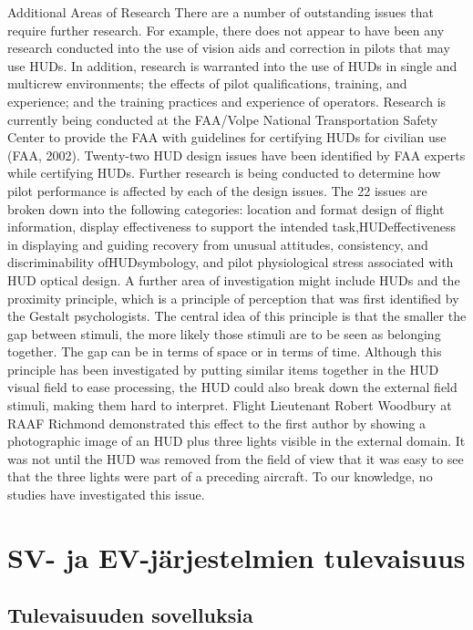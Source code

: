 \documentclass[utf8,bachelor,manualbib]{gradu3}
\begin{document}
Additional Areas of Research
There are a number of outstanding issues that require further research. For example,
there does not appear to have been any research conducted into the use of
vision aids and correction in pilots that may use HUDs. In addition, research is
warranted into the use of HUDs in single and multicrew environments; the effects
of pilot qualifications, training, and experience; and the training practices
and experience of operators.
Research is currently being conducted at the FAA/Volpe National Transportation
Safety Center to provide the FAA with guidelines for certifying HUDs for civilian
use (FAA, 2002). Twenty-two HUD design issues have been identified by
FAA experts while certifying HUDs. Further research is being conducted to determine
how pilot performance is affected by each of the design issues. The 22 issues
are broken down into the following categories: location and format design of flight
information, display effectiveness to support the intended task,HUDeffectiveness
in displaying and guiding recovery from unusual attitudes, consistency, and
discriminability ofHUDsymbology, and pilot physiological stress associated with
HUD optical design.
A further area of investigation might include HUDs and the proximity principle,
which is a principle of perception that was first identified by the Gestalt psychologists.
The central idea of this principle is that the smaller the gap between
stimuli, the more likely those stimuli are to be seen as belonging together. The gap
can be in terms of space or in terms of time. Although this principle has been investigated
by putting similar items together in the HUD visual field to ease processing,
the HUD could also break down the external field stimuli, making them hard
to interpret. Flight Lieutenant Robert Woodbury at RAAF Richmond demonstrated
this effect to the first author by showing a photographic image of an HUD
plus three lights visible in the external domain. It was not until the HUD was removed from the field of view that it was easy to see that the three lights were part of
a preceding aircraft. To our knowledge, no studies have investigated this issue. \citep{crawford2006}

\chapter{SV- ja EV-järjestelmien tulevaisuus}

\section{Tulevaisuuden sovelluksia}
\end{document}

